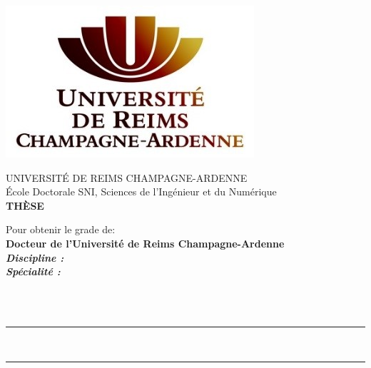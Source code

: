 \documentclass[11pt,a4paper]{book}
\begin{document}
{
\centering

{
	\includegraphics[scale=1]{figures/style/logo_urca_front_page.jpg}
	\vspace{0.3cm}
}

{
	UNIVERSIT\'E DE REIMS CHAMPAGNE-ARDENNE\\
	\vspace{0.3cm}
	\'Ecole Doctorale SNI, Sciences de l'Ing\'enieur et du Num\'erique\\
	\vspace{.8cm}
	\huge
	\textbf{TH\`ESE}
	\vspace{.3cm}
}

{
	Pour obtenir le grade de:\\ 
	\vspace{.3cm}
	\Large 
	\textbf{Docteur de l'Université de Reims Champagne-Ardenne}\\
	\vspace{.3cm}
	\large
	\textbf{\textit{Discipline : }\phdDiscipline}\\
	\vspace{.4cm}
	\textbf{\textit{Sp\'ecialit\'e : }\phdSpeciality}
}

{
	\vspace{1cm}
	\vspace{.4cm}
	\large
	\\
	\vspace{.4cm}
	\textbf{\phdAuthor}\\
	\vspace{.5cm}	
}

{
	\hrule height 2pt
	\vspace{2pt}
	\huge 
	\vspace{1cm}
	\phdTitleFR\\
	\large
	\vspace{0.5cm}
	\phdTitleEN
	\vspace{1.0cm}
	\hrule
	\vspace{1cm}
}

}
\end{document}
